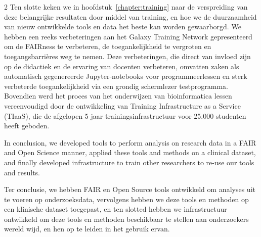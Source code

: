 \documentclass[School=EMC,Draft]{Dissertate}
\begin{document}
\begin{paracol}{2}
Ten slotte keken we in hoofdstuk~\ref{chapter:training} naar de verspreiding van deze belangrijke resultaten door middel van training, en hoe we de duurzaamheid van nieuw ontwikkelde tools en data het beste kan worden gewaarborgd.
We hebben een reeks verbeteringen aan het Galaxy Training Network gepresenteerd om de FAIRness te verbeteren, de toegankelijkheid te vergroten en toegangsbarrières weg te nemen.
Deze verbeteringen, die direct van invloed zijn op de didactiek en de ervaring van docenten verbeteren, omvatten zaken als automatisch gegenereerde Jupyter-notebooks voor programmeerlessen en sterk verbeterde toegankelijkheid via een grondig schermlezer testprogramma.
Bovendien werd het proces van het onderwijzen van bioinformatica lessen vereenvoudigd door de ontwikkeling van Training Infrastructure as a Service (TIaaS), die de afgelopen 5 jaar trainingsinfrastructuur voor 25.000 studenten heeft geboden.

\switchcolumn*

In conclusion, we developed tools to perform analysis on research data in a FAIR and Open Science manner, applied these tools and methods on a clinical dataset, and finally developed infrastructure to train other researchers to re-use our tools and results.

\switchcolumn

Ter conclusie, we hebben FAIR en Open Source tools ontwikkeld om analyses uit te voeren op onderzoeksdata, vervolgens hebben we deze tools en methoden op een klinische dataset toegepast, en ten slotted hebben we infrastructuur ontwikkeld om deze tools en methoden beschikbaar te stellen aan onderzoekers wereld wijd, en hen op te leiden in het gebruik ervan.

\switchcolumn*

\end{paracol}
\end{document}
